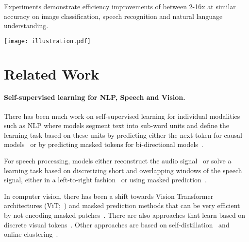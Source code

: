 \documentclass[nohyperref]{article}
\theoremstyle{plain}
\theoremstyle{definition}
\theoremstyle{remark}
\newcommand{\name}{data2vec 2.0}
\begin{document}
Experiments demonstrate efficiency improvements of between 2-16x at similar accuracy on image classification, speech recognition and natural language understanding.


\begin{figure*}[h!t]
\begin{center}
\texttt{[image: illustration.pdf]}
\caption{\name{} uses the same learning objective for different modalities (but trains different models for each). 
We first create a \emph{contextualized target} representation based on the unmasked training sample using the teacher model whose weights are an exponentially moving average of the student model. 
Target representations are contextualized due to self-attention in Transformer models.
The same target representation is predicted by the student model for different masked versions of the training example, thereby amortizing the computational cost of creating target representations.
Masked portions of the training sample are not encoded~\citep{he2021mae}.
\label{fig:model}
}
\end{center}
\end{figure*}




\section{Related Work}

\paragraph{Self-supervised learning for NLP, Speech and Vision.}
There has been much work on self-supervised learning for individual modalities such as NLP where models segment text into sub-word units and define the learning task based on these units by predicting either the next token for causal models~\citep{radford2018unsup,brown2020gpt3,chowdhery2022palm} or by predicting masked tokens for bi-directional models~\citep{devlin2018bert,baevski2019bitransformer}.

For speech processing, models either reconstruct the audio signal~\citep{eloff2019unsupervised,liu2021tera} or solve a learning task based on discretizing  short and overlapping windows of the speech signal, either in a left-to-right fashion~\citep{oord2018cpc,schneider2019wav2vec,baevski2019vqwav2vec} or using masked prediction~\citep{baevski2020wav,hsu2020hubert,chen2021wavlm}.

In computer vision, there has been a shift towards Vision Transformer architectures (ViT;~\citealt{dosovitskiy2020vit}) and masked prediction methods that can be very efficient by not encoding masked patches~\citep{he2021mae}. 
There are also approaches that learn based on discrete visual tokens~\citep{bao2021beit,peng2022beit2}.
Other approaches are based on self-distillation~\citep{grill2020byol,caron2021dino} and online clustering~\citep{caron2020swav}.
\end{document}
